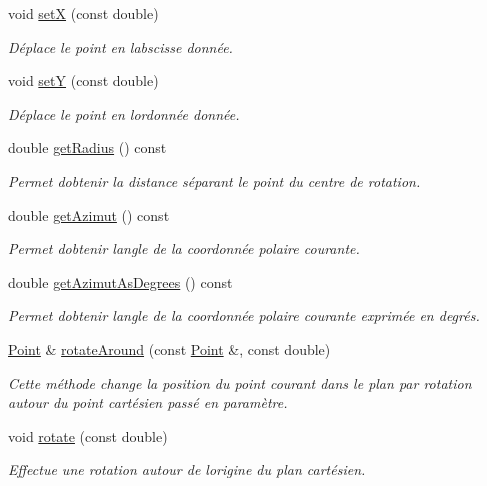 \begin{DoxyCompactItemize}
void \hyperlink{classPoint_a59ad664629f66d7faa5a97c222b11e53}{set\+X} (const double)
\begin{DoxyCompactList}\small\item\em Déplace le point en l\textquotesingle{}abscisse donnée. \end{DoxyCompactList}\item 
void \hyperlink{classPoint_a62d94bacca48640df1beb272527e0c75}{set\+Y} (const double)
\begin{DoxyCompactList}\small\item\em Déplace le point en l\textquotesingle{}ordonnée donnée. \end{DoxyCompactList}\item 
double \hyperlink{classPoint_a9109d60b782e753cc08bbdf4c5e6e4c7}{get\+Radius} () const 
\begin{DoxyCompactList}\small\item\em Permet d\textquotesingle{}obtenir la distance séparant le point du centre de rotation. \end{DoxyCompactList}\item 
double \hyperlink{classPoint_a29aedc573ec7cb54b2988cb5d5663e57}{get\+Azimut} () const 
\begin{DoxyCompactList}\small\item\em Permet d\textquotesingle{}obtenir l\textquotesingle{}angle de la coordonnée polaire courante. \end{DoxyCompactList}\item 
double \hyperlink{classPoint_a5208a853813f8a17c038f90f7434c458}{get\+Azimut\+As\+Degrees} () const 
\begin{DoxyCompactList}\small\item\em Permet d\textquotesingle{}obtenir l\textquotesingle{}angle de la coordonnée polaire courante exprimée en degrés. \end{DoxyCompactList}\item 
\hyperlink{classPoint}{Point} \& \hyperlink{classPoint_a681473d41e1569769f9fcfe1f49a1855}{rotate\+Around} (const \hyperlink{classPoint}{Point} \&, const double)
\begin{DoxyCompactList}\small\item\em Cette méthode change la position du point courant dans le plan par rotation autour du point cartésien passé en paramètre. \end{DoxyCompactList}\item 
void \hyperlink{classPoint_a7fb8d07f5e6b6e49c0f2322356c0fe8d}{rotate} (const double)
\begin{DoxyCompactList}\small\item\em Effectue une rotation autour de l\textquotesingle{}origine du plan cartésien. \end{DoxyCompactList}\item 

\end{DoxyCompactItemize}
